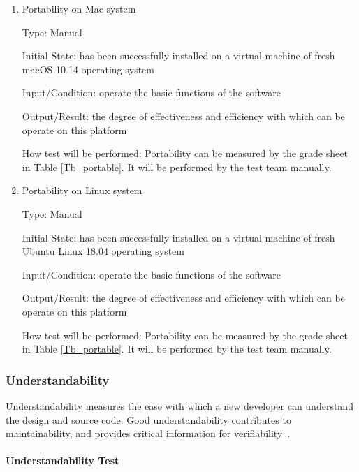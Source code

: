 \documentclass[12pt, titlepage]{article}
\begin{document}
\begin{enumerate}
\item{Portability on Mac system}

Type: Manual
					
Initial State: \progname{} has been successfully installed on a virtual machine
of fresh macOS 10.14 operating system
					
Input/Condition: operate the basic functions of the software
					
Output/Result: the degree of effectiveness and efficiency
with which \progname{} can be operate on this platform
					
How test will be performed: Portability can be measured by the grade sheet in
Table \ref{Tb_portable}. It will be performed by the test team manually.

\item{Portability on Linux system}

Type: Manual
					
Initial State: \progname{} has been successfully installed on a virtual machine
of fresh Ubuntu Linux 18.04 operating system
					
Input/Condition: operate the basic functions of the software
					
Output/Result: the degree of effectiveness and efficiency
with which \progname{} can be operate on this platform
					
How test will be performed: Portability can be measured by the grade sheet in
Table \ref{Tb_portable}. It will be performed by the test team manually.
\end{enumerate}

\subsubsection{Understandability}
\label{sec_understandtest}

Understandability measures the ease with which a new developer can understand
the design and source code. Good understandability contributes to
maintainability, and provides critical information for
verifiability~\cite{SmithEtAl2018}.

\paragraph{Understandability Test}
\end{document}
